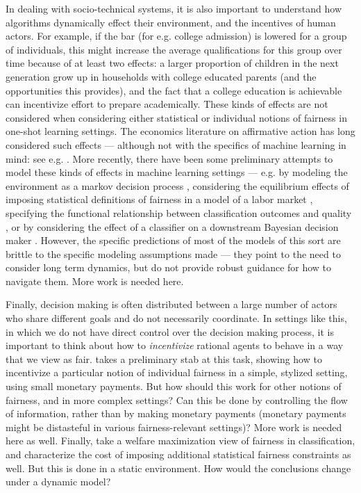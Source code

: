 In dealing with socio-technical systems, it is also important to understand how algorithms dynamically effect their environment, and the incentives of human actors. For example, if the bar (for e.g. college admission) is lowered for a group of individuals, this might increase the average qualifications for this group over time because of at least two effects: a larger proportion of children in the next generation grow up in households with college educated parents (and the opportunities this provides), and the fact that a college education is achievable can incentivize effort to prepare academically. These kinds of effects are not considered when considering either statistical or individual notions of fairness in one-shot learning settings. The economics literature on affirmative action has long considered such effects --- although not with the specifics of machine learning in mind: see e.g. \cite{FV92,coates,Beck10}. More recently, there have been some preliminary attempts to model these kinds of effects in machine learning settings --- e.g. by modeling the environment as a markov decision process \cite{JJKMR17}, considering the equilibrium effects of imposing statistical definitions of fairness in a model of a labor market \cite{HC18}, specifying the functional relationship between classification outcomes and quality \cite{delayed}, or by considering the effect of a classifier on a downstream Bayesian decision maker \cite{KRZ18}. However, the specific predictions of most of the models of this sort are brittle to the specific modeling assumptions made --- they point to the need to consider long term dynamics, but do not provide robust guidance for how to navigate them. More work is needed here.

Finally, decision making is often distributed between a large number of actors who share different goals and do not necessarily coordinate. In settings like this, in which we do not have direct control over the decision making process, it is important to think about how to \emph{incentivize} rational agents to behave in a way that we view as fair. \cite{incentives} takes a preliminary stab at this task, showing how to incentivize a particular notion of individual fairness in a simple, stylized setting, using small monetary payments. But how should this work for other notions of fairness, and in more complex settings? Can this be done by controlling the flow of information, rather than by making monetary payments (monetary payments might be distasteful in various fairness-relevant settings)? More work is needed here as well. Finally, \cite{cd17} take a welfare maximization view of fairness in classification, and characterize the cost of imposing additional statistical fairness constraints as well. But this is done in a static environment. How would the conclusions change under a dynamic model?
